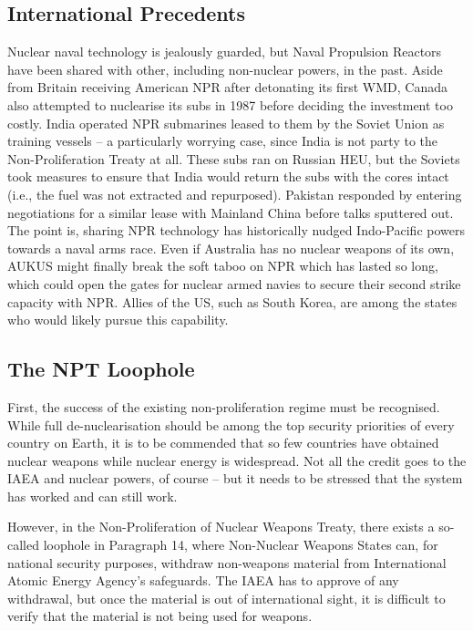 \documentclass[letterpaper,12pt,twoside]{article} %
\begin{document}
\begin{multicols}{2}
\vfill
\pagebreak
\section{International Precedents}

Nuclear naval technology is jealously guarded, but Naval Propulsion Reactors have been shared with other, including non-nuclear powers, in the past. Aside from Britain receiving American NPR after detonating its first WMD, Canada also attempted to nuclearise its subs in 1987 before deciding the investment too costly.\autocite[110]{moltz1998closing} India operated NPR submarines leased to them by the Soviet Union as training vessels -- a particularly worrying case, since India is not party to the Non-Proliferation Treaty at all. These subs ran on Russian HEU, but the Soviets took measures to ensure that India would return the subs with the cores intact (i.e., the fuel was not extracted and repurposed).\autocite{moltz1998closing} Pakistan responded by entering negotiations for a similar lease with Mainland China before talks sputtered out. The point is, sharing NPR technology has historically nudged Indo-Pacific powers towards a naval arms race. Even if Australia has no nuclear weapons of its own, AUKUS might finally break the soft taboo on NPR which has lasted so long, which could open the gates for nuclear armed navies to secure their second strike capacity with NPR.\autocite[112]{moltz1998closing} Allies of the US, such as South Korea,\autocite[9]{carlson2021aukus} are among the states who would likely pursue this capability.\autocite[7]{findlay2021not}

\subsection*{The NPT Loophole}

First, the success of the existing non-proliferation regime must be recognised. While full de-nuclearisation should be among the top security priorities of every country on Earth, it is to be commended that so few countries have obtained nuclear weapons while nuclear energy is widespread. Not all the credit goes to the IAEA and nuclear powers, of course -- but it needs to be stressed that the system has worked and can still work.

However, in the Non-Proliferation of Nuclear Weapons Treaty, there exists a so-called loophole in Paragraph 14, where Non-Nuclear Weapons States can, for national security purposes, withdraw non-weapons material from International Atomic Energy Agency's safeguards. The IAEA has to approve of any withdrawal, but once the material is out of international sight, it is difficult to verify that the material is not being used for weapons.


\end{multicols}
\end{document}
